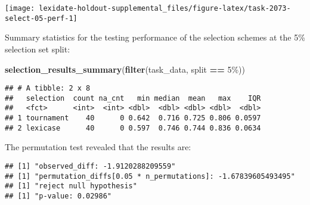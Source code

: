 \documentclass[
]{book}
\newenvironment{Shaded}{\begin{snugshade}}{\end{snugshade}}
\newcommand{\AttributeTok}[1]{\textcolor[rgb]{0.13,0.29,0.53}{#1}}
\newcommand{\DecValTok}[1]{\textcolor[rgb]{0.00,0.00,0.81}{#1}}
\newcommand{\FunctionTok}[1]{\textcolor[rgb]{0.13,0.29,0.53}{\textbf{#1}}}
\newcommand{\NormalTok}[1]{#1}
\newcommand{\OtherTok}[1]{\textcolor[rgb]{0.56,0.35,0.01}{#1}}
\newcommand{\SpecialCharTok}[1]{\textcolor[rgb]{0.81,0.36,0.00}{\textbf{#1}}}
\newcommand{\StringTok}[1]{\textcolor[rgb]{0.31,0.60,0.02}{#1}}
\begin{document}
\texttt{[image: lexidate-holdout-supplemental\_files/figure-latex/task-2073-select-05-perf-1]}

Summary statistics for the testing performance of the selection schemes at the 5\% selection set split:

\begin{Shaded}
\begin{Highlighting}[]
\FunctionTok{selection\_results\_summary}\NormalTok{(}\FunctionTok{filter}\NormalTok{(task\_data, split }\SpecialCharTok{==} \StringTok{\textquotesingle{}5\%\textquotesingle{}}\NormalTok{))}
\end{Highlighting}
\end{Shaded}

\begin{verbatim}
## # A tibble: 2 x 8
##   selection  count na_cnt   min median  mean   max    IQR
##   <fct>      <int>  <int> <dbl>  <dbl> <dbl> <dbl>  <dbl>
## 1 tournament    40      0 0.642  0.716 0.725 0.806 0.0597
## 2 lexicase      40      0 0.597  0.746 0.744 0.836 0.0634
\end{verbatim}

The permutation test revealed that the results are:

\begin{Shaded}
\end{Shaded}

\begin{verbatim}
## [1] "observed_diff: -1.9120288209559"
## [1] "permutation_diffs[0.05 * n_permutations]: -1.67839605493495"
## [1] "reject null hypothesis"
## [1] "p-value: 0.02986"
\end{verbatim}
\end{document}
